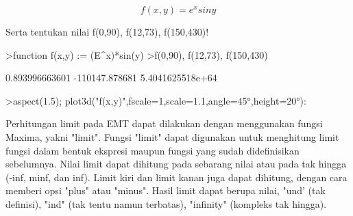 \documentclass{article}
\begin{document}
\begin{eulernotebook}
\begin{eulercomment}
\begin{eulercomment}
\begin{eulercomment}
\end{eulercomment}
\begin{eulerformula}
\[
f(x,y) = e^xsiny
\]
\end{eulerformula}
\begin{eulerttcomment}
   Serta tentukan nilai f(0,90), f(12,73), f(150,430)!
\end{eulerttcomment}
\begin{eulerprompt}
>function f(x,y) := (E^x)*sin(y)
>f(0,90), f(12,73), f(150,430)
\end{eulerprompt}
\begin{euleroutput}
  0.893996663601
  -110147.878681
  5.4041625518e+64
\end{euleroutput}
\begin{eulerprompt}
>aspect(1.5); plot3d("f(x,y)",fscale=1,scale=1.1,angle=45°,height=20°):
\end{eulerprompt}
\begin{eulercomment}
Perhitungan limit pada EMT dapat dilakukan dengan menggunakan fungsi
Maxima, yakni "limit". Fungsi "limit" dapat digunakan untuk menghitung
limit fungsi dalam bentuk ekspresi maupun fungsi yang sudah
didefinisikan sebelumnya. Nilai limit dapat dihitung pada sebarang
nilai atau pada tak hingga (-inf, minf, dan inf). Limit kiri dan limit
kanan juga dapat dihitung, dengan cara memberi opsi "plus" atau
"minus". Hasil limit dapat berupa nilai, "und' (tak definisi), "ind"
(tak tentu namun terbatas), "infinity" (kompleks tak hingga).


\end{eulercomment}
\end{eulercomment}
\end{eulercomment}
\end{eulernotebook}
\end{document}
